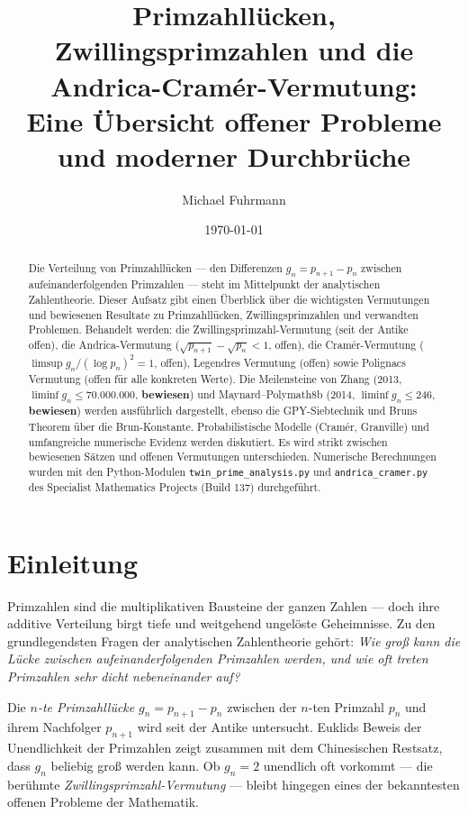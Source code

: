 \documentclass[12pt,a4paper]{amsart}
\author{Michael Fuhrmann}
\date{\today}
\title{Primzahll\"ucken, Zwillingsprimzahlen und die Andrica-Cram\'er-Vermutung:\\
Eine \"{U}bersicht offener Probleme und moderner Durchbr\"{u}che}
\theoremstyle{definition}
\begin{document}
\begin{abstract}
Die Verteilung von Primzahllücken --- den Differenzen $g_n = p_{n+1} - p_n$
zwischen aufeinanderfolgenden Primzahlen --- steht im Mittelpunkt der
analytischen Zahlentheorie. Dieser Aufsatz gibt einen Überblick über die
wichtigsten Vermutungen und bewiesenen Resultate zu Primzahllücken,
Zwillingsprimzahlen und verwandten Problemen. Behandelt werden: die
Zwillingsprimzahl-Vermutung (seit der Antike offen), die Andrica-Vermutung
($\sqrt{p_{n+1}} - \sqrt{p_n} < 1$, offen), die Cramér-Vermutung
($\limsup g_n/(\log p_n)^2 = 1$, offen), Legendres Vermutung (offen) sowie
Polignacs Vermutung (offen für alle konkreten Werte). Die Meilensteine von
Zhang (2013, $\liminf g_n \le 70{.}000{.}000$, \textbf{bewiesen}) und
Maynard--Polymath8b (2014, $\liminf g_n \le 246$, \textbf{bewiesen}) werden
ausführlich dargestellt, ebenso die GPY-Siebtechnik und Bruns Theorem
über die Brun-Konstante. Probabilistische Modelle (Cramér, Granville) und
umfangreiche numerische Evidenz werden diskutiert. Es wird strikt zwischen
bewiesenen Sätzen und offenen Vermutungen unterschieden. Numerische Berechnungen
wurden mit den Python-Modulen \texttt{twin\_prime\_analysis.py} und
\texttt{andrica\_cramer.py} des Specialist Mathematics Projects (Build 137)
durchgeführt.
\end{abstract}

\maketitle
\tableofcontents

\section{Einleitung}

Primzahlen sind die multiplikativen Bausteine der ganzen Zahlen --- doch ihre
additive Verteilung birgt tiefe und weitgehend ungel\"{o}ste Geheimnisse. Zu den
grundlegendsten Fragen der analytischen Zahlentheorie geh\"{o}rt: \emph{Wie gro\ss{}
kann die L\"{u}cke zwischen aufeinanderfolgenden Primzahlen werden, und wie oft
treten Primzahlen sehr dicht nebeneinander auf?}

Die \emph{$n$-te Primzahll\"{u}cke} $g_n = p_{n+1} - p_n$ zwischen der $n$-ten
Primzahl $p_n$ und ihrem Nachfolger $p_{n+1}$ wird seit der Antike untersucht.
Euklids Beweis der Unendlichkeit der Primzahlen zeigt zusammen mit dem
Chinesischen Restsatz, dass $g_n$ beliebig gro\ss{} werden kann. Ob $g_n = 2$
unendlich oft vorkommt --- die ber\"{u}hmte \emph{Zwillingsprimzahl-Vermutung} ---
bleibt hingegen eines der bekanntesten offenen Probleme der Mathematik.
\end{document}
